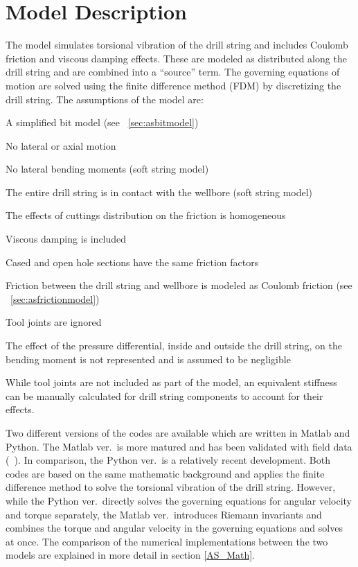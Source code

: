 \section{Model Description}
The model simulates torsional vibration of the drill string and includes Coulomb friction and viscous damping effects.  These are modeled as distributed along the drill string and are combined into a ``source'' term. The governing equations of motion are solved using the finite difference method (FDM) by discretizing the drill string. The assumptions of the model are:
\begin{bulletedlist}
	\item A simplified bit model (see \sectionname~\ref{sec:asbitmodel})
	\item No lateral or axial motion
    \item No lateral bending moments (soft string model)
    \item The entire drill string is in contact with the wellbore (soft string model)
	\item The effects of cuttings distribution on the friction is homogeneous
	\item Viscous damping is included
	\item Cased and open hole sections have the same friction factors
    \item Friction between the drill string and wellbore is modeled as Coulomb friction (see \sectionname~\ref{sec:asfrictionmodel})
    \item Tool joints are ignored
    \item The effect of the pressure differential, inside and outside the drill string, on the bending moment is not represented and is assumed to be negligible
\end{bulletedlist}
While tool joints are not included as part of the model, an equivalent stiffness can be manually calculated for drill string components to account for their effects.

Two different versions of the codes are available which are written in Matlab and Python. The Matlab ver.\ is more matured and has been validated with field data (~\cite{ref:aarsnes2017a}). In comparison, the Python ver.\ is a relatively recent development. Both codes are based on the same mathematic background and applies the finite difference method to solve the torsional vibration of the drill string. However, while the Python ver.\ directly solves the governing equations for angular velocity and torque separately, the Matlab ver.\ introduces Riemann invariants and combines the torque and angular velocity in the governing equations and solves at once. The comparison of the numerical implementations between the two models are explained in more detail in section \ref{AS_Math}.

